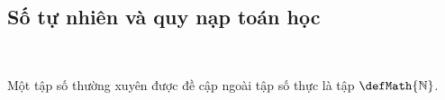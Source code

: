 \subsection{Số tự nhiên và quy nạp toán học}

\ %

Một tập số thường xuyên được đề cập ngoài tập số thực là tập  $\defMath{\mathbb{N}}$. 